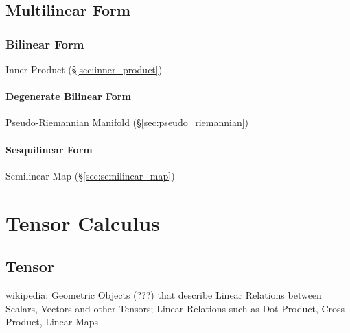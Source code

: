 \subsection{Multilinear Form}\label{sec:multilinear_form}

\subsubsection{Bilinear Form}\label{sec:bilinear_form}

Inner Product (\S\ref{sec:inner_product})



\paragraph{Degenerate Bilinear Form}
\label{sec:degenerate_bilinear_form}

Pseudo-Riemannian Manifold (\S\ref{sec:pseudo_riemannian})



\paragraph{Sesquilinear Form}\label{sec:sesquilinear_form}\hfill

Semilinear Map (\S\ref{sec:semilinear_map})



\section{Tensor Calculus}\label{sec:tensor_calculus}

\subsection{Tensor}\label{sec:linear_tensor}

wikipedia: Geometric Objects (???) that describe Linear Relations
between Scalars, Vectors and other Tensors; Linear Relations such as
Dot Product, Cross Product, Linear Maps


